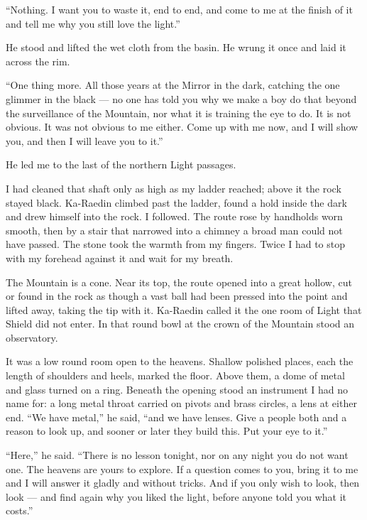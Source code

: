 ``Nothing. I want you to waste it, end to end, and come to me at the finish of it and tell me why you still love the light.''\par

He stood and lifted the wet cloth from the basin. He wrung it once and laid it across the rim.\par

``One thing more. All those years at the Mirror in the dark, catching the one glimmer in the black --- no one has told you why we make a boy do that beyond the surveillance of the Mountain, nor what it is training the eye to do. It is not obvious. It was not obvious to me either. Come up with me now, and I will show you, and then I will leave you to it.''\par

He led me to the last of the northern Light passages.\par

I had cleaned that shaft only as high as my ladder reached; above it the rock stayed black. Ka-Raedin climbed past the ladder, found a hold inside the dark and drew himself into the rock. I followed. The route rose by handholds worn smooth, then by a stair that narrowed into a chimney a broad man could not have passed. The stone took the warmth from my fingers. Twice I had to stop with my forehead against it and wait for my breath.

The Mountain is a cone. Near its top, the route opened into a great hollow, cut or found in the rock as though a vast ball had been pressed into the point and lifted away, taking the tip with it. Ka-Raedin called it the one room of Light that Shield did not enter. In that round bowl at the crown of the Mountain stood an observatory.\par

It was a low round room open to the heavens. Shallow polished places, each the length of shoulders and heels, marked the floor. Above them, a dome of metal and glass turned on a ring. Beneath the opening stood an instrument I had no name for: a long metal throat carried on pivots and brass circles, a lens at either end. ``We have metal,'' he said, ``and we have lenses. Give a people both and a reason to look up, and sooner or later they build this. Put your eye to it.''\par

``Here,'' he said. ``There is no lesson tonight, nor on any night you do not want one. The heavens are yours to explore. If a question comes to you, bring it to me and I will answer it gladly and without tricks. And if you only wish to look, then look --- and find again why you liked the light, before anyone told you what it costs.''\par

